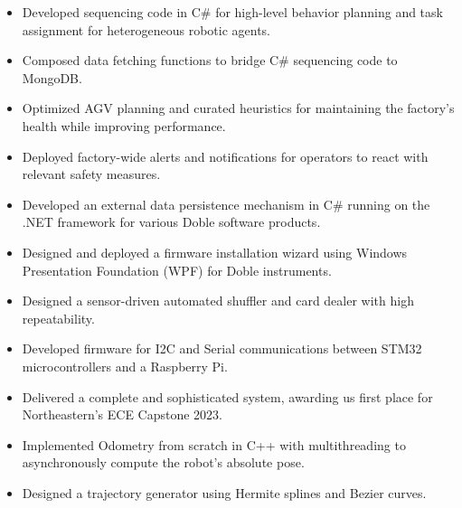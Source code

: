 \documentclass[10pt,a4paper,ragged2e,withhyper]{altacv}
\begin{document}
    \begin{itemize}
        \item Developed sequencing code in C\# for high-level behavior planning and task assignment for heterogeneous robotic agents.
        \item Composed data fetching functions to bridge C\# sequencing code to MongoDB.
        \item Optimized AGV planning and curated heuristics for maintaining the factory's health while improving performance.
        \item Deployed factory-wide alerts and notifications for operators to react with relevant safety measures.
    \end{itemize}
    \begin{itemize}
        \item Developed an external data persistence mechanism in C\# running on the .NET framework for various Doble software products.
        \item Designed and deployed a firmware installation wizard using Windows Presentation Foundation (WPF) for Doble instruments.
    \end{itemize}
    \vspace{-1.45em}
    \begin{itemize}
        \item Designed a sensor-driven automated shuffler and card dealer with high repeatability.
        \item Developed firmware for I2C and Serial communications between STM32 microcontrollers and a Raspberry Pi.
        \item Delivered a complete and sophisticated system, awarding us first place for Northeastern's ECE Capstone 2023.
    \end{itemize}
    \begin{itemize}
        \item Implemented Odometry from scratch in C++ with multithreading to asynchronously compute the robot's absolute pose.
        \item Designed a trajectory generator using Hermite splines and Bezier curves.
    \end{itemize}
\end{document}

